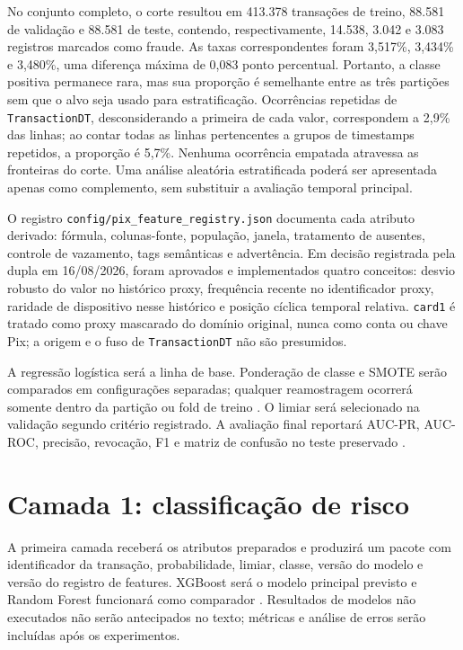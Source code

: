 No conjunto completo, o corte resultou em 413.378 transações de treino, 88.581 de validação e 88.581 de teste, contendo, respectivamente, 14.538, 3.042 e 3.083 registros marcados como fraude. As taxas correspondentes foram 3,517\%, 3,434\% e 3,480\%, uma diferença máxima de 0,083 ponto percentual. Portanto, a classe positiva permanece rara, mas sua proporção é semelhante entre as três partições sem que o alvo seja usado para estratificação. Ocorrências repetidas de \texttt{TransactionDT}, desconsiderando a primeira de cada valor, correspondem a 2,9\% das linhas; ao contar todas as linhas pertencentes a grupos de timestamps repetidos, a proporção é 5,7\%. Nenhuma ocorrência empatada atravessa as fronteiras do corte. Uma análise aleatória estratificada poderá ser apresentada apenas como complemento, sem substituir a avaliação temporal principal.

O registro \texttt{config/pix\_feature\_registry.json} documenta cada atributo derivado: fórmula, colunas-fonte, população, janela, tratamento de ausentes, controle de vazamento, tags semânticas e advertência. Em decisão registrada pela dupla em 16/08/2026, foram aprovados e implementados quatro conceitos: desvio robusto do valor no histórico proxy, frequência recente no identificador proxy, raridade de dispositivo nesse histórico e posição cíclica temporal relativa. \texttt{card1} é tratado como proxy mascarado do domínio original, nunca como conta ou chave Pix; a origem e o fuso de \texttt{TransactionDT} não são presumidos.

A regressão logística será a linha de base. Ponderação de classe e SMOTE serão comparados em configurações separadas; qualquer reamostragem ocorrerá somente dentro da partição ou fold de treino \cite{chawla2002smote}. O limiar será selecionado na validação segundo critério registrado. A avaliação final reportará AUC-PR, AUC-ROC, precisão, revocação, F1 e matriz de confusão no teste preservado \cite{saito2015precision}.

\section{Camada 1: classificação de risco}

A primeira camada receberá os atributos preparados e produzirá um pacote com identificador da transação, probabilidade, limiar, classe, versão do modelo e versão do registro de features. XGBoost será o modelo principal previsto e Random Forest funcionará como comparador \cite{breiman2001random,chen2016xgboost}. Resultados de modelos não executados não serão antecipados no texto; métricas e análise de erros serão incluídas após os experimentos.

